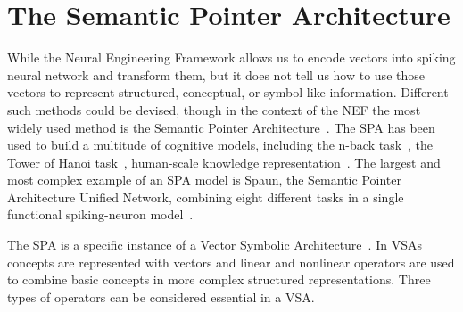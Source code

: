 \chapter{The Semantic Pointer Architecture}\label{sec:spa}
While the Neural Engineering Framework allows us to encode vectors into spiking neural network and transform them, but it does not tell us how to use those vectors to represent structured, conceptual, or symbol-like information.
Different such methods could be devised, though in the context of the NEF the most widely used method is the Semantic Pointer Architecture~\parencite[SPA;][]{eliasmith2013}.
The SPA has been used to build a multitude of cognitive models, including the n-back task~\parencite{gosmann2015}, the Tower of Hanoi task~\parencite{stewart2011-2}, human-scale knowledge representation~\parencite{crawford2013}.
The largest and most complex example of an SPA model is Spaun, the Semantic Pointer Architecture Unified Network, combining eight different tasks in a single functional spiking-neuron model~\parencite{eliasmith2012}.

The SPA is a specific instance of a Vector Symbolic Architecture~\parencite[VSA;][]{gayler_vector_2003}.
In VSAs concepts are represented with vectors and linear and nonlinear operators are used to combine basic concepts in more complex structured representations.
Three types of operators can be considered essential in a VSA\@.

